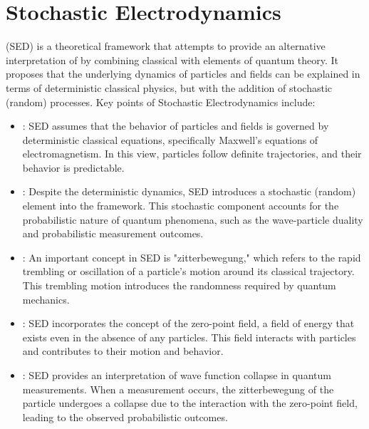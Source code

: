 \chapter{Stochastic Electrodynamics}
\thispagestyle{fancy}

 (SED) is a theoretical framework that attempts to provide an alternative interpretation of  by combining classical  with elements of quantum theory. It proposes that the underlying dynamics of particles and fields can be explained in terms of deterministic classical physics, but with the addition of stochastic (random) processes. Key points of Stochastic Electrodynamics include:


\begin{itemize}
	\item {}: SED assumes that the behavior of particles and fields is governed by deterministic classical equations, specifically Maxwell's equations of electromagnetism. In this view, particles follow definite trajectories, and their behavior is predictable.

	\item {}: Despite the deterministic dynamics, SED introduces a stochastic (random) element into the framework. This stochastic component accounts for the probabilistic nature of quantum phenomena, such as the wave-particle duality and probabilistic measurement outcomes.

	\item {}: An important concept in SED is "zitterbewegung," which refers to the rapid trembling or oscillation of a particle's motion around its classical trajectory. This trembling motion introduces the randomness required by quantum mechanics.

	\item {}: SED incorporates the concept of the zero-point field, a field of energy that exists even in the absence of any particles. This field interacts with particles and contributes to their motion and behavior.

	\item {}: SED provides an interpretation of wave function collapse in quantum measurements. When a measurement occurs, the zitterbewegung of the particle undergoes a collapse due to the interaction with the zero-point field, leading to the observed probabilistic outcomes.


\end{itemize}
